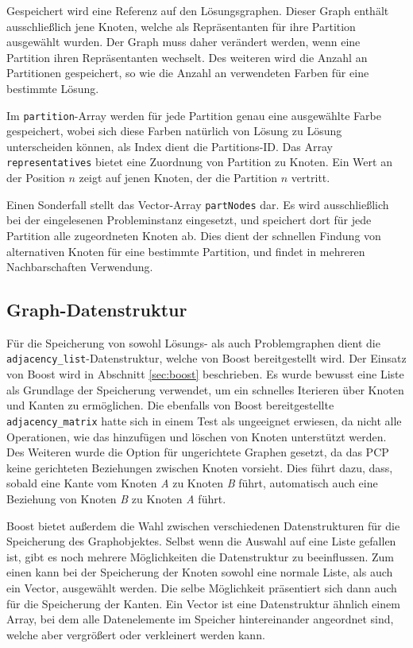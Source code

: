 Gespeichert wird eine Referenz auf den Lösungsgraphen. Dieser Graph enthält ausschließlich jene Knoten, welche als Repräsentanten für ihre Partition
ausgewählt wurden. Der Graph muss daher verändert werden, wenn eine Partition ihren Repräsentanten wechselt. Des weiteren wird die Anzahl an Partitionen
gespeichert, so wie die Anzahl an verwendeten Farben für eine bestimmte Lösung. 

Im \texttt{partition}-Array werden für jede Partition genau eine ausgewählte Farbe gespeichert, wobei sich diese Farben natürlich von Lösung zu Lösung 
unterscheiden können, als Index dient die Partitions-ID. Das Array \texttt{representatives} bietet eine Zuordnung von Partition zu Knoten. Ein Wert 
an der Position $n$ zeigt auf jenen Knoten, der die Partition $n$ vertritt.

Einen Sonderfall stellt das Vector-Array \texttt{partNodes} dar. Es wird ausschließlich bei der eingelesenen Probleminstanz eingesetzt, und speichert
dort für jede Partition alle zugeordneten Knoten ab. Dies dient der schnellen Findung von alternativen Knoten für eine bestimmte Partition, und findet
in mehreren Nachbarschaften Verwendung. 

\subsection{Graph-Datenstruktur}
Für die Speicherung von sowohl Lösungs- als auch Problemgraphen dient die \texttt{adjacency\_list}-Datenstruktur, welche von Boost bereitgestellt wird. Der Einsatz von Boost wird in Abschnitt \ref{sec:boost} 
beschrieben. Es wurde bewusst eine Liste als Grundlage der Speicherung verwendet, um ein schnelles Iterieren über Knoten und Kanten zu ermöglichen. Die ebenfalls von Boost bereitgestellte 
\texttt{adjacency\_matrix} hatte sich in einem Test als ungeeignet erwiesen, da nicht alle Operationen, wie das hinzufügen und löschen von Knoten unterstützt werden. Des Weiteren wurde die Option für 
ungerichtete Graphen gesetzt, da das PCP keine gerichteten Beziehungen zwischen Knoten vorsieht. Dies führt dazu, dass, sobald eine Kante vom Knoten \textit{A} zu Knoten \textit{B} führt, automatisch auch
eine Beziehung von Knoten \textit{B} zu Knoten \textit{A} führt.

Boost bietet außerdem die Wahl zwischen verschiedenen Datenstrukturen für die Speicherung des Graphobjektes. Selbst wenn die Auswahl auf eine Liste gefallen ist, gibt es noch mehrere Möglichkeiten die Datenstruktur
zu beeinflussen. Zum einen kann bei der Speicherung der Knoten sowohl eine normale Liste, als auch ein Vector, ausgewählt werden. Die selbe Möglichkeit präsentiert sich dann auch für die Speicherung der Kanten.
Ein Vector ist eine Datenstruktur ähnlich einem Array, bei dem alle Datenelemente im Speicher hintereinander angeordnet sind, welche aber vergrößert oder verkleinert werden kann.


